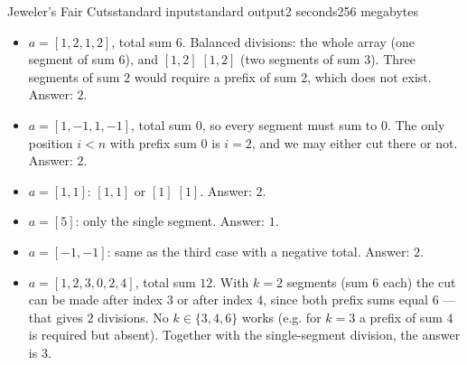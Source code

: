 \begin{problem}{Jeweler's Fair Cuts}{standard input}{standard output}{2 seconds}{256 megabytes}
\begin{itemize}
  \item $a = [1, 2, 1, 2]$, total sum $6$. Balanced divisions: the whole array (one segment of sum $6$), and $[1, 2]\;[1, 2]$ (two segments of sum $3$). Three segments of sum $2$ would require a prefix of sum $2$, which does not exist. Answer: $2$.
  \item $a = [1, -1, 1, -1]$, total sum $0$, so every segment must sum to $0$. The only position $i < n$ with prefix sum $0$ is $i = 2$, and we may either cut there or not. Answer: $2$.
  \item $a = [1, 1]$: $[1, 1]$ or $[1]\;[1]$. Answer: $2$.
  \item $a = [5]$: only the single segment. Answer: $1$.
  \item $a = [-1, -1]$: same as the third case with a negative total. Answer: $2$.
  \item $a = [1, 2, 3, 0, 2, 4]$, total sum $12$. With $k = 2$ segments (sum $6$ each) the cut can be made after index $3$ or after index $4$, since both prefix sums equal $6$ --- that gives $2$ divisions. No $k \in \{3, 4, 6\}$ works (e.g. for $k = 3$ a prefix of sum $4$ is required but absent). Together with the single-segment division, the answer is $3$.
\end{itemize}


\end{problem}

